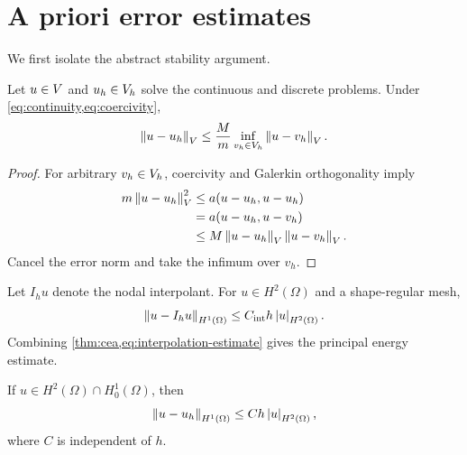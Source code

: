 \section{A priori error estimates}
\label{sec:error-estimates}

We first isolate the abstract stability argument.

\begin{theorem}[C\'ea's lemma]
\label{thm:cea}
Let $u\in V$ and $u_h\in V_h$ solve the continuous and discrete problems.
Under \cref{eq:continuity,eq:coercivity},
\begin{equation}
  \left\lVert u-u_h \right\rVert_{V}
  \leq \frac{M}{m}
  \inf_{v_h\in V_h}\left\lVert u-v_h \right\rVert_{V}.
  \label{eq:cea-estimate}
\end{equation}
\end{theorem}

\begin{proof}
For arbitrary $v_h\in V_h$, coercivity and Galerkin orthogonality imply
\begin{align*}
  m\left\lVert u-u_h \right\rVert_{V}^2
  &\leq a(u-u_h,u-u_h)\\
  &=a(u-u_h,u-v_h)\\
  &\leq M\left\lVert u-u_h \right\rVert_{V}\left\lVert u-v_h \right\rVert_{V}.
\end{align*}
Cancel the error norm and take the infimum over $v_h$.
\end{proof}

Let $I_hu$ denote the nodal interpolant. For $u\in H^2(\Omega)$ and a
shape-regular mesh,
\begin{equation}
  \left\lVert u-I_hu \right\rVert_{H^1(\Omega)}
  \leq C_{\mathrm{int}}h\left\lvert u \right\rvert_{H^2(\Omega)}.
  \label{eq:interpolation-estimate}
\end{equation}
Combining \cref{thm:cea,eq:interpolation-estimate} gives the principal energy
estimate.

\begin{corollary}
\label{cor:energy-rate}
If $u\in H^2(\Omega)\cap H_0^1(\Omega)$, then
\begin{equation}
  \left\lVert u-u_h \right\rVert_{H^1(\Omega)}
  \leq C h\left\lvert u \right\rvert_{H^2(\Omega)},
  \label{eq:h1-error}
\end{equation}
where $C$ is independent of $h$.
\end{corollary}

